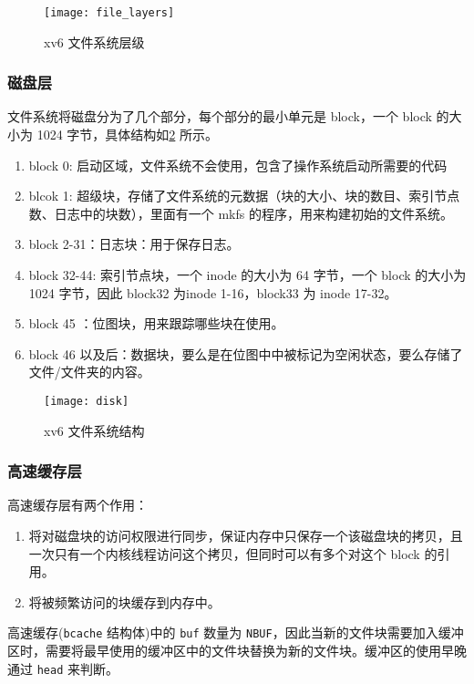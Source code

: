 \begin{figure}[!htb]
	\centering
	\texttt{[image: file\_layers]}
	\caption{xv6 文件系统层级}
	\label{fig:file_layers}
\end{figure}

\subsubsection{磁盘层}

文件系统将磁盘分为了几个部分，每个部分的最小单元是 block，一个 block 的大小为 1024 字节，具体结构如\cref{fig:disk} 所示。

\begin{enumerate}
	\item block 0: 启动区域，文件系统不会使用，包含了操作系统启动所需要的代码
	\item blcok 1: 超级块，存储了文件系统的元数据（块的大小、块的数目、索引节点数、日志中的块数），里面有一个 mkfs 的程序，用来构建初始的文件系统。
	\item block 2-31：日志块：用于保存日志。
	\item block 32-44: 索引节点块，一个 inode 的大小为 64 字节，一个 block 的大小为 1024 字节，因此 block32 为inode 1-16，block33 为 inode 17-32。
	\item block 45 ：位图块，用来跟踪哪些块在使用。
    \item block 46 以及后：数据块，要么是在位图中中被标记为空闲状态，要么存储了文件/文件夹的内容。
\end{enumerate}

\begin{figure}[!htb]
	\centering
	\texttt{[image: disk]}
	\caption{xv6 文件系统结构}
	\label{fig:disk}
\end{figure}

\subsubsection{高速缓存层}

高速缓存层有两个作用：

\begin{enumerate}
	\item 将对磁盘块的访问权限进行同步，保证内存中只保存一个该磁盘块的拷贝，且一次只有一个内核线程访问这个拷贝，但同时可以有多个对这个 block 的引用。
	\item 将被频繁访问的块缓存到内存中。
\end{enumerate}

高速缓存(\texttt{bcache} 结构体)中的 \texttt{buf} 数量为 \texttt{NBUF}，因此当新的文件块需要加入缓冲区时，需要将最早使用的缓冲区中的文件块替换为新的文件块。缓冲区的使用早晚通过 \texttt{head} 来判断。

